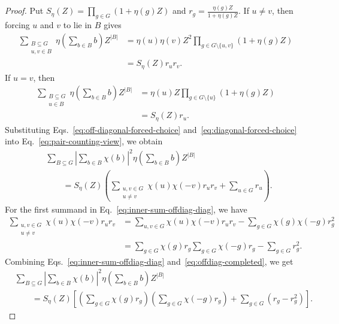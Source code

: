 \documentclass[11pt]{article}
\theoremstyle{definition}
\begin{document}
\begin{proof}
Put $S_\eta(Z)=\prod_{g\in G}(1+\eta(g)Z)$ and $r_g=\frac{\eta(g)Z}{1+\eta(g)Z}$. If \(u\ne v\), then forcing \(u\) and \(v\) to lie in \(B\) gives
\begin{equation}\label{eq:off-diagonal-forced-choice}
	\begin{aligned}
		\sum_{\substack{B\subseteq G\\ u,v\in B}}
		\eta\left(\sum_{b\in B}b\right)Z^{|B|}
		&=
		\eta(u)\eta(v)Z^2
		\prod_{g\in G\setminus\{u,v\}}(1+\eta(g)Z)  \\
		&=
		S_\eta(Z)r_ur_v.
	\end{aligned}
\end{equation}
If \(u=v\), then 
\begin{equation}\label{eq:diagonal-forced-choice}
	\begin{aligned}
		\sum_{\substack{B\subseteq G\\ u\in B}}
		\eta\left(\sum_{b\in B}b\right)Z^{|B|}
		&=
		\eta(u)Z
		\prod_{g\in G\setminus\{u\}}(1+\eta(g)Z)  \\
		&=
		S_\eta(Z)r_u.
	\end{aligned}
\end{equation}
Substituting Eqs.~\eqref{eq:off-diagonal-forced-choice} and~\eqref{eq:diagonal-forced-choice} into Eq.~\eqref{eq:pair-counting-view}, we obtain
\begin{equation}\label{eq:inner-sum-offdiag-diag}
	\begin{aligned}
		&\sum_{B\subseteq G}
		\left|\sum_{b\in B}\chi(b)\right|^2
		\eta\left(\sum_{b\in B}b\right)Z^{|B|} \\
		&\qquad =
		S_\eta(Z)
		\left(\sum_{\substack{u,v\in G\\ u\ne v}}
		\chi(u)\chi(-v)r_ur_v
		+
		\sum_{u\in G}r_u
		\right).
	\end{aligned}
\end{equation}
For the first summand in Eq.~\eqref{eq:inner-sum-offdiag-diag}, we have
\begin{equation}\label{eq:offdiag-completed}
	\begin{aligned}
		\sum_{\substack{u,v\in G\\ u\ne v}}
		\chi(u)\chi(-v)r_ur_v
		&=
		\sum_{u,v\in G}\chi(u)\chi(-v)r_ur_v
		-
		\sum_{g\in G}\chi(g)\chi(-g)r_g^2  \\
		&=
	\sum_{g\in G}\chi(g)r_g
	\sum_{g\in G}\chi(-g)r_g
		-
		\sum_{g\in G}r_g^2.
	\end{aligned}
\end{equation}
Combining Eqs.~\eqref{eq:inner-sum-offdiag-diag} and~\eqref{eq:offdiag-completed}, we get
\begin{equation}\label{eq:inner-sum-final}
	\begin{aligned}
		&\sum_{B\subseteq G}
		\left|\sum_{b\in B}\chi(b)\right|^2
		\eta\left(\sum_{b\in B}b\right)Z^{|B|} \\
		&\qquad =
		S_\eta(Z)
		\left[
		\left(\sum_{g\in G}\chi(g)r_g\right)
		\left(\sum_{g\in G}\chi(-g)r_g\right)
		+
		\sum_{g\in G}(r_g-r_g^2)
		\right].
	\end{aligned}
	\end{equation}


\end{proof}
\end{document}
